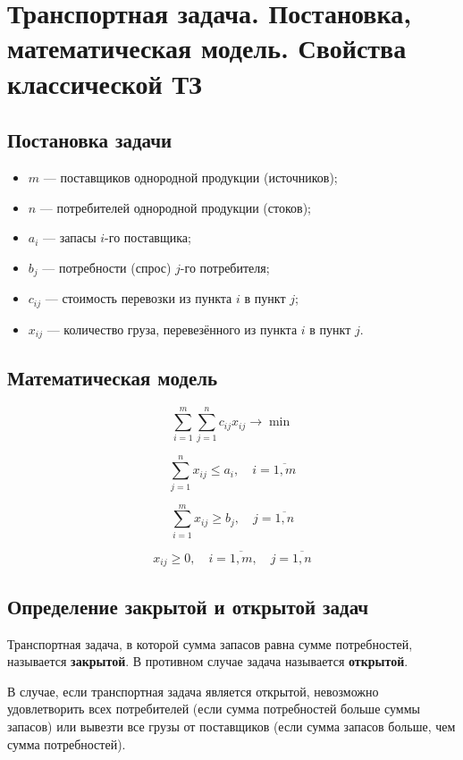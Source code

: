 \documentclass[17pt]{extarticle}
\begin{document}
\section{Транспортная задача. Постановка, \\ математическая модель. Свойства \\ классической ТЗ}
\subsection{Постановка задачи}
\begin{itemize}
    \item \( m \) — поставщиков однородной продукции (источников);
    \item \( n \) — потребителей однородной продукции (стоков);
    \item \( a_i \) — запасы \( i \)-го поставщика;
    \item \( b_j \) — потребности (спрос) \( j \)-го потребителя;
    \item \( c_{ij} \) — стоимость перевозки из пункта \( i \) в пункт \( j \);
    \item \( x_{ij} \) — количество груза, перевезённого из пункта \( i \) в пункт \( j \).
\end{itemize}

\subsection{Математическая модель}
\[
    \sum_{i=1}^{m} \sum_{j=1}^{n} c_{ij}x_{ij} \rightarrow \min
\]

\[
    \sum_{j=1}^{n} x_{ij} \leq a_i, \quad i = \overline{1, m}
\]

\[
    \sum_{i=1}^{m} x_{ij} \geq b_j, \quad j = \overline{1, n}
\]

\[
    x_{ij} \geq 0, \quad i = \overline{1, m}, \quad j = \overline{1, n}
\]

\subsection{Определение закрытой и открытой задач}
\begin{definition}
    Транспортная задача, в которой сумма запасов равна сумме потребностей, называется \textbf{закрытой}. В противном случае задача называется \textbf{открытой}.
\end{definition}

В случае, если транспортная задача является открытой, невозможно удовлетворить всех потребителей (если сумма потребностей больше суммы запасов) или вывезти все грузы от поставщиков (если сумма запасов больше, чем сумма потребностей).
\end{document}
